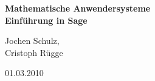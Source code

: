 \usepackage[psamsfonts]{amssymb}
\usepackage{amsmath}
\usepackage[svgnames]{xcolor} %




\parindent0cm %



\newenvironment{aufg}[1]
{\begin{samepage}%
\colorbox{light-gray}{%
 \makebox[\textwidth]{%
\textbf{Aufgabe \arabic{zaehler} } }\hspace{-\textwidth}\makebox[\textwidth]{\hfill #1 Punkte} }\\[0.1cm]       %
\begin{minipage}{\textwidth}}
{\end{minipage} \nopagebreak %
\\ 
\stepcounter{zaehler}                           %
 \end{samepage}%
}



\begin{center}
\textbf{\LARGE Mathematische Anwendersysteme }\\
\textbf{\LARGE Einführung in Sage}\\\medskip
\end{center}
\begin{minipage}{6cm}
Jochen Schulz,\\
Cristoph Rügge
\end{minipage}\hfill
\begin{minipage}{4cm}
01.03.2010
\end{minipage}\\[1cm]

